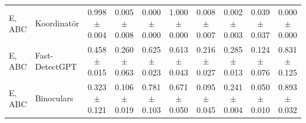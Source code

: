 \begin{table}[t]
\begin{tabular}{@{}llcccccccc@{}}
E, ABC & Koordinatör & 0.998$\pm$0.004 & 0.005$\pm$0.008 & 0.000$\pm$0.000 & 1.000$\pm$0.000 & 0.008$\pm$0.007 & 0.002$\pm$0.003 & 0.039$\pm$0.037 & 0.000$\pm$0.000 \\
E, ABC & Fast-DetectGPT & 0.458$\pm$0.015 & 0.260$\pm$0.063 & 0.625$\pm$0.023 & 0.613$\pm$0.043 & 0.216$\pm$0.027 & 0.285$\pm$0.013 & 0.124$\pm$0.076 & 0.831$\pm$0.125 \\
E, ABC & Binoculars & 0.323$\pm$0.121 & 0.106$\pm$0.019 & 0.781$\pm$0.103 & 0.671$\pm$0.050 & 0.095$\pm$0.045 & 0.241$\pm$0.004 & 0.050$\pm$0.010 & 0.893$\pm$0.032 \\
\bottomrule
\end{tabular}
\end{table}
